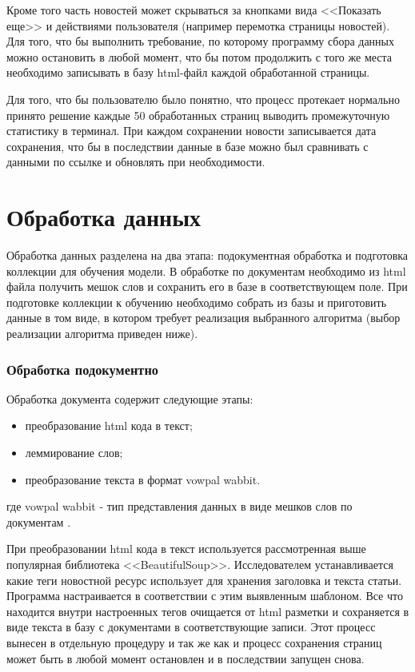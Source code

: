 Кроме того часть новостей может скрываться за кнопками вида <<Показать еще>> и действиями пользователя (например перемотка страницы новостей). Для того, что бы выполнить требование, по которому программу сбора данных можно остановить в любой момент, что бы потом продолжить с того же места необходимо записывать в базу html-файл каждой обработанной страницы.

Для того, что бы пользователю было понятно, что процесс протекает нормально принято решение каждые 50 обработанных страниц выводить промежуточную статистику в терминал. При каждом сохранении новости записывается дата сохранения, что бы в последствии данные в базе можно был сравнивать с данными по ссылке и обновлять при необходимости.

\section{Обработка данных}

Обработка данных разделена на два этапа: подокументная обработка и подготовка коллекции для обучения модели. В обработке по документам необходимо из html файла получить мешок слов и сохранить его в базе в соответствующем поле. При подготовке коллекции к обучению необходимо собрать из базы и приготовить данные в том виде, в котором требует реализация выбранного алгоритма (выбор реализации алгоритма приведен ниже).

\subsubsection{Обработка подокументно}

Обработка документа содержит следующие этапы:

\begin{itemize}
    \item преобразование html кода в текст;
    \item леммирование слов;
    \item преобразование текста в формат vowpal wabbit.
\end{itemize}
где vowpal wabbit - тип представления данных в виде мешков слов по документам \cite{VowpalWabbit}.

При преобразовании html кода в текст используется рассмотренная выше популярная библиотека <<BeautifulSoup>>. Исследователем устанавливается какие теги новостной ресурс использует для хранения заголовка и текста статьи. Программа настраивается в соответствии с этим выявленным шаблоном. Все что находится внутри настроенных тегов очищается от html разметки и сохраняется в виде текста в базу с документами в соответствующие записи. Этот процесс вынесен в отдельную процедуру и так же как и процесс сохранения страниц может быть в любой момент остановлен и в последствии запущен снова.

